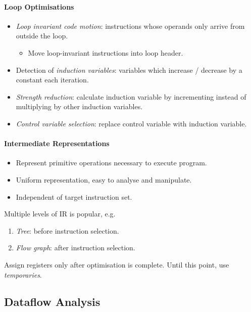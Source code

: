 \documentclass[twocolumn,english]{article}
\begin{document}
\paragraph{Loop Optimisations}
\begin{itemize}
\item \emph{Loop invariant code motion}: instructions whose operands only
arrive from outside the loop.
\begin{itemize}
\item Move loop-invariant instructions into loop header.
\end{itemize}
\item Detection of \emph{induction variables}: variables which increase
/ decrease by a constant each iteration.
\item \emph{Strength reduction}: calculate induction variable by incrementing
instead of multiplying by other induction variables. 
\item \emph{Control variable selection}: replace control variable with induction
variable.
\end{itemize}

\paragraph{Intermediate Representations}
\begin{itemize}
\item Represent primitive operations necessary to execute program.
\item Uniform representation, easy to analyse and manipulate.
\item Independent of target instruction set.
\end{itemize}
Multiple levels of IR is popular, e.g.
\begin{enumerate}
\item \emph{Tree}: before instruction selection.
\item \emph{Flow graph}: after instruction selection.
\end{enumerate}
Assign registers only after optimisation is complete. Until this point,
use \emph{temporaries}.

\subsection{Dataflow Analysis}
\end{document}
